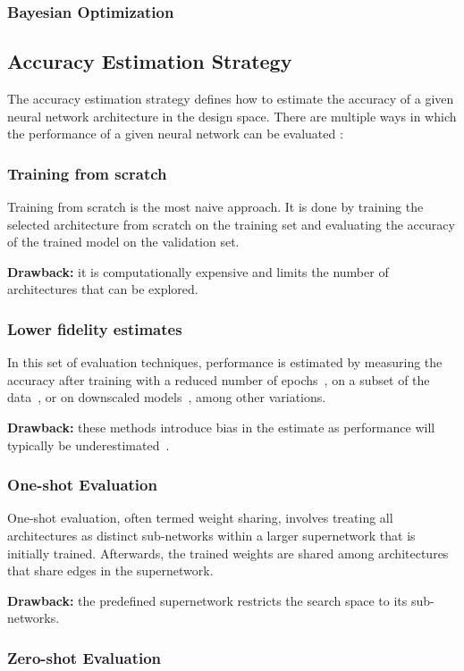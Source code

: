         \subsubsection{Bayesian Optimization}



    \subsection{Accuracy Estimation Strategy}
        The accuracy estimation strategy defines how to estimate the accuracy of a given neural network architecture in the design space. There are multiple ways in which the performance of a given neural network can be evaluated :  
    
        \subsubsection{Training from scratch}
            Training from scratch is the most naive approach. It is done by training the selected architecture from scratch on the training set and evaluating the accuracy of the trained model on the validation set.
        
            \textbf{Drawback:} it is computationally expensive and limits the number of architectures that can be explored.

        \subsubsection{Lower fidelity estimates}
            In this set of evaluation techniques, performance is estimated by measuring the accuracy after training with a reduced number of epochs~\cite{nasrl}, on a subset of the data~\cite{subset}, or on downscaled models~\cite{nasrl}, among other variations.

            \textbf{Drawback:} these methods introduce bias in the estimate as performance will typically be underestimated~\cite{NAS-survey}.
            

        \subsubsection{One-shot Evaluation}

            One-shot evaluation, often termed weight sharing, involves treating all architectures as distinct sub-networks within a larger supernetwork that is initially trained. Afterwards, the trained weights are shared among architectures that share edges in the supernetwork.~\cite{smash}
            
            \textbf{Drawback:} the predefined supernetwork restricts the search space to its sub-networks.

        \subsubsection{Zero-shot Evaluation}
